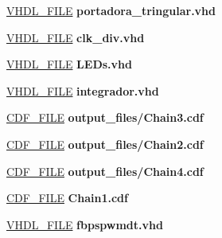 \begin{DoxyCompactItemize}
\item 
\hyperlink{_d_e0___n_a_n_o___v_f_8qsf_aa30d06e793a65909e96b56e389170068}{V\+H\+D\+L\+\_\+\+F\+I\+L\+E} {\bfseries \textcolor{vhdlchar}{portadora\+\_\+tringular}\textcolor{vhdlchar}{.}\textcolor{vhdlchar}{vhd}\textcolor{vhdlchar}{ }} 
\item 
\hyperlink{_d_e0___n_a_n_o___v_f_8qsf_a05b1d81caa4070ec80efbe3629657ac1}{V\+H\+D\+L\+\_\+\+F\+I\+L\+E} {\bfseries \textcolor{vhdlchar}{clk\+\_\+div}\textcolor{vhdlchar}{.}\textcolor{vhdlchar}{vhd}\textcolor{vhdlchar}{ }} 
\item 
\hyperlink{_d_e0___n_a_n_o___v_f_8qsf_a56911a1b536f03388a57c27f160f1c37}{V\+H\+D\+L\+\_\+\+F\+I\+L\+E} {\bfseries \textcolor{vhdlchar}{L\+E\+Ds}\textcolor{vhdlchar}{.}\textcolor{vhdlchar}{vhd}\textcolor{vhdlchar}{ }} 
\item 
\hyperlink{_d_e0___n_a_n_o___v_f_8qsf_af3ef501ea8035dd99b04e8f007c19e49}{V\+H\+D\+L\+\_\+\+F\+I\+L\+E} {\bfseries \textcolor{vhdlchar}{integrador}\textcolor{vhdlchar}{.}\textcolor{vhdlchar}{vhd}\textcolor{vhdlchar}{ }} 
\item 
\hyperlink{_d_e0___n_a_n_o___v_f_8qsf_aedf274921e323e9b7cb1b48433456e0a}{C\+D\+F\+\_\+\+F\+I\+L\+E} {\bfseries \textcolor{vhdlchar}{output\+\_\+files}\textcolor{vhdlchar}{/}\textcolor{vhdlchar}{Chain3}\textcolor{vhdlchar}{.}\textcolor{vhdlchar}{cdf}\textcolor{vhdlchar}{ }} 
\item 
\hyperlink{_d_e0___n_a_n_o___v_f_8qsf_a2d1c22823500d7885cd1036c1158b03a}{C\+D\+F\+\_\+\+F\+I\+L\+E} {\bfseries \textcolor{vhdlchar}{output\+\_\+files}\textcolor{vhdlchar}{/}\textcolor{vhdlchar}{Chain2}\textcolor{vhdlchar}{.}\textcolor{vhdlchar}{cdf}\textcolor{vhdlchar}{ }} 
\item 
\hyperlink{_d_e0___n_a_n_o___v_f_8qsf_af1c3235584e167ad7e0c5a520effe51c}{C\+D\+F\+\_\+\+F\+I\+L\+E} {\bfseries \textcolor{vhdlchar}{output\+\_\+files}\textcolor{vhdlchar}{/}\textcolor{vhdlchar}{Chain4}\textcolor{vhdlchar}{.}\textcolor{vhdlchar}{cdf}\textcolor{vhdlchar}{ }} 
\item 
\hyperlink{_d_e0___n_a_n_o___v_f_8qsf_af3518fa9a026fef1e4d8e13067bf0784}{C\+D\+F\+\_\+\+F\+I\+L\+E} {\bfseries \textcolor{vhdlchar}{Chain1}\textcolor{vhdlchar}{.}\textcolor{vhdlchar}{cdf}\textcolor{vhdlchar}{ }} 
\item 
\hyperlink{_d_e0___n_a_n_o___v_f_8qsf_a35eb27ca85461145af829d3dab4b9e86}{V\+H\+D\+L\+\_\+\+F\+I\+L\+E} {\bfseries \textcolor{vhdlchar}{fbpspwmdt}\textcolor{vhdlchar}{.}\textcolor{vhdlchar}{vhd}\textcolor{vhdlchar}{ }} 
\item 

\end{DoxyCompactItemize}
